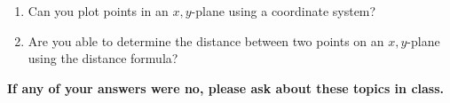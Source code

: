 \documentclass[11pt]{article}
\begin{document}
\begin{enumerate}
\item Can you plot points in an $x,y$-plane using a coordinate system?\\
\item Are you able to determine the distance between two points on an $x,y$-plane using the distance formula?\\
\end{enumerate}

\noindent \textbf{If any of your answers were no, please ask about these topics in class.}
\end{document}
